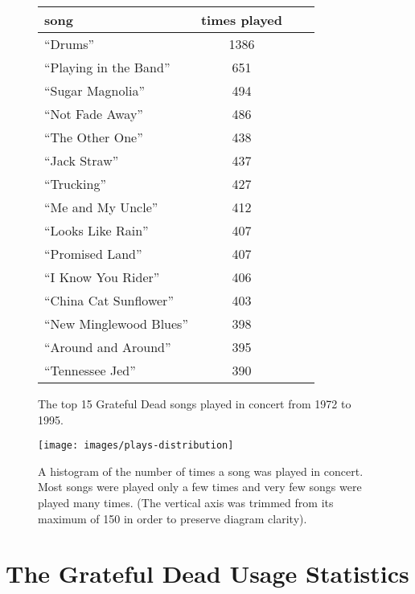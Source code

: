 \documentclass{svmult}
\newcommand{\ttt}[1]{``#1''}
\begin{document}
\begin{figure}[h!]
    \begin{minipage}{2.75in}
\begin{center}
\begin{footnotesize}
\begin{tabular}{lcll|}
\hline
\textbf{song}&\textbf{times played}\\\hline
\ttt{Drums}&1386\\
\ttt{Playing in the Band}&651\\ 
\ttt{Sugar Magnolia}&494\\ 
\ttt{Not Fade Away}&486\\ 
\ttt{The Other One}&438\\ 
\ttt{Jack Straw}&437\\ 
\ttt{Trucking}&427\\ 
\ttt{Me and My Uncle}&412\\ 
\ttt{Looks Like Rain}&407\\ 
\ttt{Promised Land}&407\\ 
\ttt{I Know You Rider}&406\\ 
\ttt{China Cat Sunflower}&403\\ 
\ttt{New Minglewood Blues}&398\\ 
\ttt{Around and Around}&395\\ 
\ttt{Tennessee Jed}&390\\
\hline
\end{tabular}
\caption{\label{tab:plays}The top 15 Grateful Dead songs played in concert from 1972 to 1995.}
\end{footnotesize}
\end{center}
\end{minipage}
\qquad
\begin{minipage}{2.75in}
\begin{center}
\texttt{[image: images/plays-distribution]}
\caption{\label{fig:plays-distribution}A histogram of the number of times a song was played in concert. Most songs were played only a few times and very few songs were played many times. (The vertical axis was trimmed from its maximum of 150 in order to preserve diagram clarity).}
\end{center}
\end{minipage}
\end{figure}

\section{The Grateful Dead Usage Statistics\label{sec:usage}}
\end{document}
